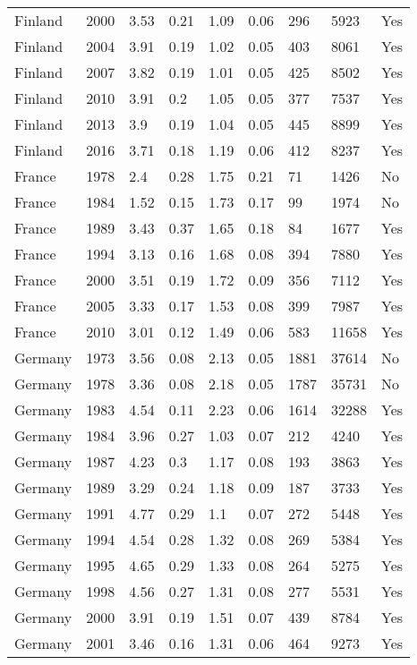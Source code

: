\begin{tabular}{lllllllll}
Finland & 2000 & 3.53 & 0.21 & 1.09 & 0.06 & 296 & 5923 & Yes \\ 
Finland & 2004 & 3.91 & 0.19 & 1.02 & 0.05 & 403 & 8061 & Yes \\ 
Finland & 2007 & 3.82 & 0.19 & 1.01 & 0.05 & 425 & 8502 & Yes \\ 
Finland & 2010 & 3.91 & 0.2 & 1.05 & 0.05 & 377 & 7537 & Yes \\ 
Finland & 2013 & 3.9 & 0.19 & 1.04 & 0.05 & 445 & 8899 & Yes \\ 
Finland & 2016 & 3.71 & 0.18 & 1.19 & 0.06 & 412 & 8237 & Yes \\ 
France & 1978 & 2.4 & 0.28 & 1.75 & 0.21 & 71 & 1426 & No \\ 
France & 1984 & 1.52 & 0.15 & 1.73 & 0.17 & 99 & 1974 & No \\ 
France & 1989 & 3.43 & 0.37 & 1.65 & 0.18 & 84 & 1677 & Yes \\ 
France & 1994 & 3.13 & 0.16 & 1.68 & 0.08 & 394 & 7880 & Yes \\ 
France & 2000 & 3.51 & 0.19 & 1.72 & 0.09 & 356 & 7112 & Yes \\ 
France & 2005 & 3.33 & 0.17 & 1.53 & 0.08 & 399 & 7987 & Yes \\ 
France & 2010 & 3.01 & 0.12 & 1.49 & 0.06 & 583 & 11658 & Yes \\ 
Germany & 1973 & 3.56 & 0.08 & 2.13 & 0.05 & 1881 & 37614 & No \\ 
Germany & 1978 & 3.36 & 0.08 & 2.18 & 0.05 & 1787 & 35731 & No \\ 
Germany & 1983 & 4.54 & 0.11 & 2.23 & 0.06 & 1614 & 32288 & Yes \\ 
Germany & 1984 & 3.96 & 0.27 & 1.03 & 0.07 & 212 & 4240 & Yes \\ 
Germany & 1987 & 4.23 & 0.3 & 1.17 & 0.08 & 193 & 3863 & Yes \\ 
Germany & 1989 & 3.29 & 0.24 & 1.18 & 0.09 & 187 & 3733 & Yes \\ 
Germany & 1991 & 4.77 & 0.29 & 1.1 & 0.07 & 272 & 5448 & Yes \\ 
Germany & 1994 & 4.54 & 0.28 & 1.32 & 0.08 & 269 & 5384 & Yes \\ 
Germany & 1995 & 4.65 & 0.29 & 1.33 & 0.08 & 264 & 5275 & Yes \\ 
Germany & 1998 & 4.56 & 0.27 & 1.31 & 0.08 & 277 & 5531 & Yes \\ 
Germany & 2000 & 3.91 & 0.19 & 1.51 & 0.07 & 439 & 8784 & Yes \\ 
Germany & 2001 & 3.46 & 0.16 & 1.31 & 0.06 & 464 & 9273 & Yes \\ 

\end{tabular}
